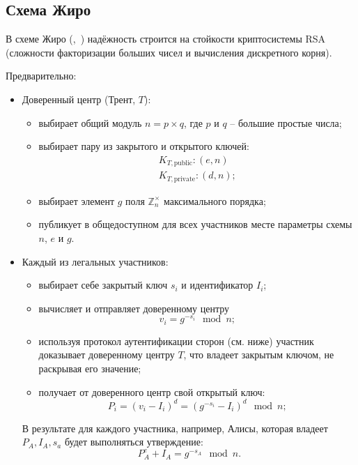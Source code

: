 \subsection{Схема Жиро}\label{section-girault-scheme}

В схеме Жиро (,~\cite{Girault:1990, Girault:1991}) надёжность строится на стойкости криптосистемы RSA (сложности факторизации больших чисел и вычисления дискретного корня).

Предварительно:
\begin{itemize}
    \item Доверенный центр (Трент, $T$):
    \begin{itemize}
        \item выбирает общий модуль $n = p \times q$, где $p$ и $q$ -- большие простые числа;
        \item выбирает пару из закрытого и открытого ключей:\[\begin{array}{l}
            K_{T, \text{public}}: (e, n) \\
            K_{T, \text{private}}: (d, n);
        \end{array}\]
        \item выбирает элемент $g$ поля $\mathbb{Z}_n^{\times}$ максимального порядка;
        \item публикует в общедоступном для всех участников месте параметры схемы $n$, $e$ и $g$.
    \end{itemize}
    \item Каждый из легальных участников:
    \begin{itemize}
        \item выбирает себе закрытый ключ $s_i$ и идентификатор $I_i$;
        \item вычисляет и отправляет доверенному центру\[v_i = g^{-s_i} \mod n;\]
        \item используя протокол аутентификации сторон (см. ниже) участник доказывает доверенному центру $T$, что владеет закрытым ключом, не раскрывая его значение;
        \item получает от доверенного центр свой открытый ключ:
            \[ P_i = (v_i - I_i)^d = (g^{-s_i} - I_i)^d \mod n; \]
    \end{itemize}
    В результате для каждого участника, например, Алисы, которая владеет $P_A, I_A, s_a$ будет выполняться утверждение:
        \[ P_A^e + I_A = g^{-s_A} \mod n. \]
\end{itemize}

